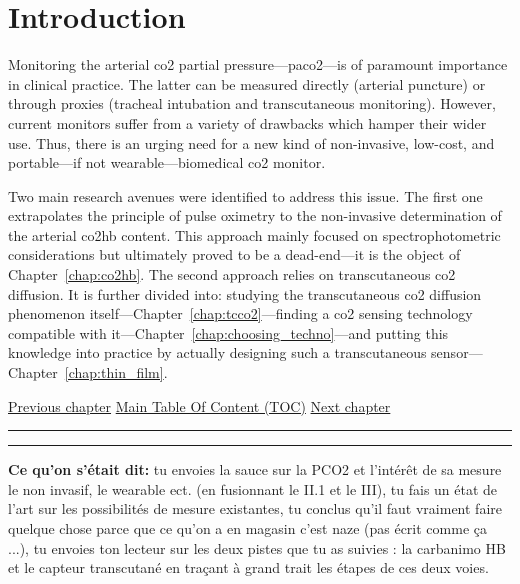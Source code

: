 \chapter{Introduction}\label{chap:intro}

\begin{tldrbox}
	
	Monitoring the arterial \gls{co2} partial pressure---\gls{paco2}---is of paramount importance in clinical practice. The latter can be measured directly (arterial puncture) or through proxies (tracheal intubation and transcutaneous monitoring). However, current monitors suffer from a variety of drawbacks which hamper their wider use. Thus, there is an urging need for a new kind of non-invasive, low-cost, and portable---if not wearable---biomedical \gls{co2} monitor.
	
	Two main research avenues were identified to address this issue. The first one extrapolates the principle of pulse oximetry to the non-invasive determination of the arterial \gls{co2hb} content. This approach mainly focused on spectrophotometric considerations but ultimately proved to be a dead-end---it is the object of Chapter~\ref{chap:co2hb}. The second approach relies on transcutaneous \gls{co2} diffusion. It is further divided into: studying the transcutaneous \gls{co2} diffusion phenomenon itself---Chapter~\ref{chap:tcco2}---finding a \gls{co2} sensing technology compatible with it---Chapter~\ref{chap:choosing_techno}---and putting this knowledge into practice by actually designing such a transcutaneous sensor---Chapter~\ref{chap:thin_film}.
	
	\tcblower
	
	\hyperref[forechap:ack]{Previous chapter} \hfill \hyperref[chapter:toc]{Main Table Of Content (TOC)} \hfill \hyperref[chap:co2hb]{Next chapter}
	
\end{tldrbox}\glsresetall

\vspace{.3cm}\hrule\vspace{.1cm}\hrule\vspace{.3cm}

\textbf{Ce qu'on s'était dit:} tu envoies la sauce sur la PCO2 et l’intérêt de sa mesure le non invasif, le wearable ect.  (en fusionnant le II.1 et le III), tu fais un état de l'art sur les possibilités de mesure existantes, tu conclus qu'il faut vraiment faire quelque chose parce que ce qu'on a en magasin c'est naze (pas écrit comme ça ...), tu envoies ton lecteur sur les deux pistes que tu as suivies : la carbanimo HB et le capteur transcutané en traçant à grand trait les étapes de ces deux voies.

